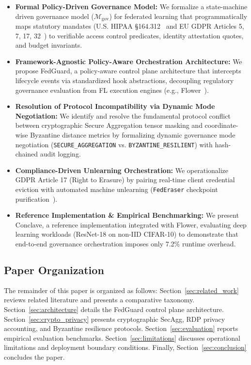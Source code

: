 \begin{itemize}
    \item \textbf{Formal Policy-Driven Governance Model:} We formalize a state-machine driven governance model ($\mathcal{M}_{\text{gov}}$) for federated learning that programmatically maps statutory mandates (U.S. HIPAA \S164.312~\cite{hipaa2003security} and EU GDPR Articles 5, 7, 17, 32~\cite{gdpr2016regulation}) to verifiable access control predicates, identity attestation quotes, and budget invariants.
    \item \textbf{Framework-Agnostic Policy-Aware Orchestration Architecture:} We propose FedGuard, a policy-aware control plane architecture that intercepts lifecycle events via standardized hook abstractions, decoupling regulatory governance evaluation from FL execution engines (e.g., Flower~\cite{beutel2020flower}).
    \item \textbf{Resolution of Protocol Incompatibility via Dynamic Mode Negotiation:} We identify and resolve the fundamental protocol conflict between cryptographic Secure Aggregation tensor masking and coordinate-wise Byzantine distance metrics by formalizing dynamic governance mode negotiation (\texttt{SECURE\_AGGREGATION} vs. \texttt{BYZANTINE\_RESILIENT}) with hash-chained audit logging.
    \item \textbf{Compliance-Driven Unlearning Orchestration:} We operationalize GDPR Article 17 (Right to Erasure) by pairing real-time client credential eviction with automated machine unlearning (\texttt{FedEraser} checkpoint purification~\cite{liu2021federaser}).
    \item \textbf{Reference Implementation \& Empirical Benchmarking:} We present Conclave, a reference implementation integrated with Flower, evaluating deep learning workloads (ResNet-18 on non-IID CIFAR-10) to demonstrate that end-to-end governance orchestration imposes only 7.2\% runtime overhead.
\end{itemize}

\subsection{Paper Organization}

The remainder of this paper is organized as follows: Section~\ref{sec:related_work} reviews related literature and presents a comparative taxonomy. Section~\ref{sec:architecture} details the FedGuard control plane architecture. Section~\ref{sec:crypto_privacy} presents cryptographic SecAgg, RDP privacy accounting, and Byzantine resilience protocols. Section~\ref{sec:evaluation} reports empirical evaluation benchmarks. Section~\ref{sec:limitations} discusses operational limitations and deployment boundary conditions. Finally, Section~\ref{sec:conclusion} concludes the paper.